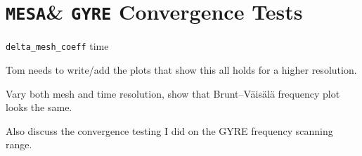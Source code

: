 \documentclass[twocolumn, twocolappendix, oneside]{aastex631}
\newcommand{\bvf}{Brunt–Väisälä frequency\xspace}
\newcommand{\mesa}{\texttt{MESA}\xspace}
\newcommand{\gyre}{\texttt{GYRE}\xspace}
\begin{document}
\section{\mesa \& \gyre Convergence Tests}\label{app:res_tests}
\texttt{delta\_mesh\_coeff} time

Tom needs to write/add the plots that show this all holds for a higher resolution.

Vary both mesh and time resolution, show that \bvf plot looks the same.

Also discuss the convergence testing I did on the GYRE frequency scanning range.
\end{document}
